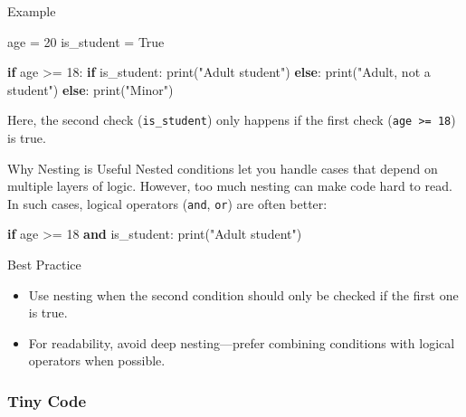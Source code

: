 \documentclass[
  letterpaper,
  DIV=11,
  numbers=noendperiod]{scrreprt}
\newenvironment{Shaded}{\begin{snugshade}}{\end{snugshade}}
\newcommand{\BuiltInTok}[1]{\textcolor[rgb]{0.00,0.23,0.31}{#1}}
\newcommand{\ControlFlowTok}[1]{\textcolor[rgb]{0.00,0.23,0.31}{\textbf{#1}}}
\newcommand{\DecValTok}[1]{\textcolor[rgb]{0.68,0.00,0.00}{#1}}
\newcommand{\KeywordTok}[1]{\textcolor[rgb]{0.00,0.23,0.31}{\textbf{#1}}}
\newcommand{\NormalTok}[1]{\textcolor[rgb]{0.00,0.23,0.31}{#1}}
\newcommand{\OperatorTok}[1]{\textcolor[rgb]{0.37,0.37,0.37}{#1}}
\newcommand{\StringTok}[1]{\textcolor[rgb]{0.13,0.47,0.30}{#1}}
\newcommand{\VariableTok}[1]{\textcolor[rgb]{0.07,0.07,0.07}{#1}}
\providecommand{\tightlist}{%
  \setlength{\itemsep}{0pt}\setlength{\parskip}{0pt}}
\begin{document}
Example

\begin{Shaded}
\begin{Highlighting}[]
\NormalTok{age }\OperatorTok{=} \DecValTok{20}
\NormalTok{is\_student }\OperatorTok{=} \VariableTok{True}

\ControlFlowTok{if}\NormalTok{ age }\OperatorTok{\textgreater{}=} \DecValTok{18}\NormalTok{:}
    \ControlFlowTok{if}\NormalTok{ is\_student:}
        \BuiltInTok{print}\NormalTok{(}\StringTok{"Adult student"}\NormalTok{)}
    \ControlFlowTok{else}\NormalTok{:}
        \BuiltInTok{print}\NormalTok{(}\StringTok{"Adult, not a student"}\NormalTok{)}
\ControlFlowTok{else}\NormalTok{:}
    \BuiltInTok{print}\NormalTok{(}\StringTok{"Minor"}\NormalTok{)}
\end{Highlighting}
\end{Shaded}

Here, the second check (\texttt{is\_student}) only happens if the first
check (\texttt{age\ \textgreater{}=\ 18}) is true.

Why Nesting is Useful Nested conditions let you handle cases that depend
on multiple layers of logic. However, too much nesting can make code
hard to read. In such cases, logical operators (\texttt{and},
\texttt{or}) are often better:

\begin{Shaded}
\begin{Highlighting}[]
\ControlFlowTok{if}\NormalTok{ age }\OperatorTok{\textgreater{}=} \DecValTok{18} \KeywordTok{and}\NormalTok{ is\_student:}
    \BuiltInTok{print}\NormalTok{(}\StringTok{"Adult student"}\NormalTok{)}
\end{Highlighting}
\end{Shaded}

Best Practice

\begin{itemize}
\tightlist
\item
  Use nesting when the second condition should only be checked if the
  first one is true.
\item
  For readability, avoid deep nesting---prefer combining conditions with
  logical operators when possible.
\end{itemize}

\subsubsection{Tiny Code}\label{tiny-code-16}
\end{document}
